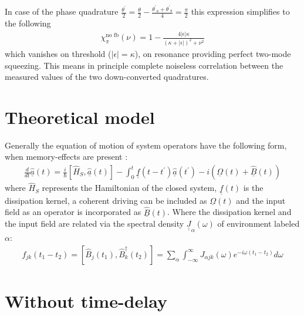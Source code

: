 \documentclass[final,review,3p,times,12pt]{elsarticle}
\def\thetap{\theta^\prime}
\def\Hop{\hat{H}}
\def\Bop{\hat{B}}
\def\Bdop{\hat{B}^\dagger}
\def\thetap{{\theta^\prime}}
\newcommand{\lsz}{\left[}
\newcommand{\rsz}{\right]}
\newcommand{\lk}{\left(}
\newcommand{\rk}{\right)}
\def\dul#1{\underline{\underline{#1}}}
\begin{document}
In case of the phase quadrature $\frac{\thetap}{2}=\frac{\theta}{2}-\frac{\thetap_a+\thetap_b}{4}=\frac{\pi}{2}$ this expression simplifies to the following
\begin{align}
\chi_\pi^\text{no fb}(\nu)=1-\frac{4|\epsilon|\kappa}{\lk\kappa+|\epsilon|\rk^2+\nu^2}
\end{align}
which vanishes on threshold ($|\epsilon|=\kappa$), on resonance providing perfect two-mode squeezing. This means in principle complete noiseless correlation between the measured values of the two down-converted quadratures.

\section{Theoretical model}
Generally the equation of motion of system operators have the following form, when memory-effects are present \cite{Whalen2016}:
\begin{align}
\frac{d}{dt}\hat{\underline{a}}(t) = \frac{i}{\hbar}\lsz\Hop_S, \hat{\underline{a}}(t)\rsz - 
\int_0^t\dul{f}(t-t^\prime)\hat{\underline{a}}(t^\prime) - 
i\left(\underline{\Omega}(t)+\hat{\underline{B}}(t)\right)
\end{align}
where $\Hop_S$ represents the Hamiltonian of the closed system, $\dul{f}(t)$ is the dissipation kernel, a coherent driving can be included as $\underline{\Omega}(t)$ and the input field as an operator is incorporated as $\underline{\Bop}(t)$. Where the dissipation kernel and the input field are related via the spectral density $\dul{J}_{\alpha}(\omega)$ of environment labeled $\alpha$:
\begin{align}
f_{jk}(t_{1}-t_{2})=\lsz\Bop_j(t_1),\Bdop_k(t_2)\rsz=\sum_\alpha\int_{-\infty}^\infty J_{\alpha jk}(\omega)e^{-i\omega (t_{1}-t_{2})}d\omega
\end{align}

\section{Without time-delay}
\end{document}
